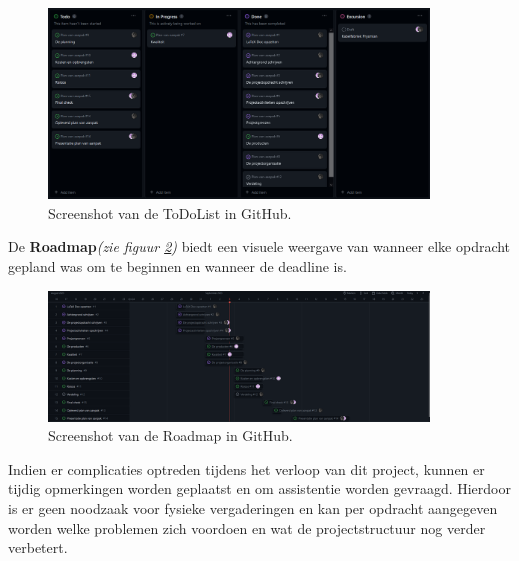 \begin{figure}[h]
\centering
\includegraphics[width=0.9\textwidth]{IMG/todolist.PNG}
\caption{Screenshot van de ToDoList in GitHub.}
\label{fig:todolist}
\end{figure}

De \textbf{Roadmap}\textit{(zie figuur \ref{fig:roadmap})} biedt een visuele weergave van wanneer elke opdracht gepland was om te beginnen en wanneer de deadline is.

\begin{figure}[h]
\centering
\includegraphics[width=0.9\textwidth]{IMG/roadmap.PNG}
\caption{Screenshot van de Roadmap in GitHub.}
\label{fig:roadmap}
\end{figure}

Indien er complicaties optreden tijdens het verloop van dit project, kunnen er tijdig opmerkingen worden geplaatst en om assistentie worden gevraagd. Hierdoor is er geen noodzaak voor fysieke vergaderingen en kan per opdracht aangegeven worden welke problemen zich voordoen en wat de projectstructuur nog verder verbetert.




